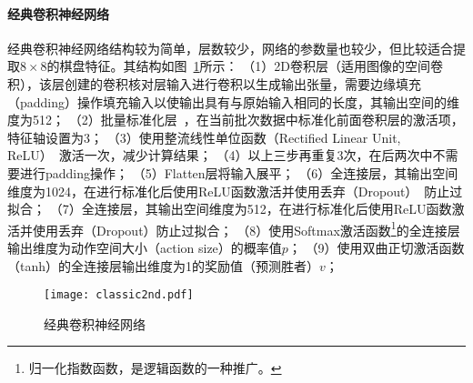 \paragraph{经典卷积神经网络}
经典卷积神经网络结构较为简单，层数较少，网络的参数量也较少，但比较适合提取$8\times8$的棋盘特征。其结构如图~\ref{fig:cnn}所示：
（1）2D卷积层（适用图像的空间卷积），该层创建的卷积核对层输入进行卷积以生成输出张量，需要边缘填充（padding）操作填充输入以使输出具有与原始输入相同的长度，其输出空间的维度为512；
（2）批量标准化层~\cite{batchnorm}，在当前批次数据中标准化前面卷积层的激活项，特征轴设置为3；
（3）使用整流线性单位函数（Rectified Linear Unit, ReLU）~\cite{xu2015empirical}激活一次，减少计算结果；
（4）以上三步再重复3次，在后两次中不需要进行padding操作；
（5）Flatten层将输入展平；
（6）全连接层，其输出空间维度为1024，在进行标准化后使用ReLU函数激活并使用丢弃（Dropout）~\cite{srivastava2014dropout}防止过拟合；
（7）全连接层，其输出空间维度为512，在进行标准化后使用ReLU函数激活并使用丢弃（Dropout）防止过拟合；
（8）使用Softmax激活函数\footnote{归一化指数函数，是逻辑函数的一种推广。}的全连接层输出维度为动作空间大小（action size）的概率值$p$；
（9）使用双曲正切激活函数（tanh）的全连接层输出维度为1的奖励值（预测胜者）$v$；
\begin{figure}[H]
    \centering
    \texttt{[image: classic2nd.pdf]}
    \caption[cnn]{%
    经典卷积神经网络%
      }
    \label{fig:cnn}
\end{figure}
